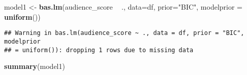 \documentclass[]{article}
\newenvironment{Shaded}{\begin{snugshade}}{\end{snugshade}}
\newcommand{\KeywordTok}[1]{\textcolor[rgb]{0.13,0.29,0.53}{\textbf{#1}}}
\newcommand{\DataTypeTok}[1]{\textcolor[rgb]{0.13,0.29,0.53}{#1}}
\newcommand{\StringTok}[1]{\textcolor[rgb]{0.31,0.60,0.02}{#1}}
\newcommand{\OperatorTok}[1]{\textcolor[rgb]{0.81,0.36,0.00}{\textbf{#1}}}
\newcommand{\NormalTok}[1]{#1}
\begin{document}
\begin{Shaded}
\begin{Highlighting}[]
\NormalTok{model1 <-}\StringTok{ }\KeywordTok{bas.lm}\NormalTok{(audience_score }\OperatorTok{~}\StringTok{ }\NormalTok{., }\DataTypeTok{data=}\NormalTok{df,}
               \DataTypeTok{prior=}\StringTok{"BIC"}\NormalTok{,}
               \DataTypeTok{modelprior =} \KeywordTok{uniform}\NormalTok{())}
\end{Highlighting}
\end{Shaded}

\begin{verbatim}
## Warning in bas.lm(audience_score ~ ., data = df, prior = "BIC", modelprior
## = uniform()): dropping 1 rows due to missing data
\end{verbatim}

\begin{Shaded}
\begin{Highlighting}[]
\KeywordTok{summary}\NormalTok{(model1)}
\end{Highlighting}
\end{Shaded}
\end{document}
